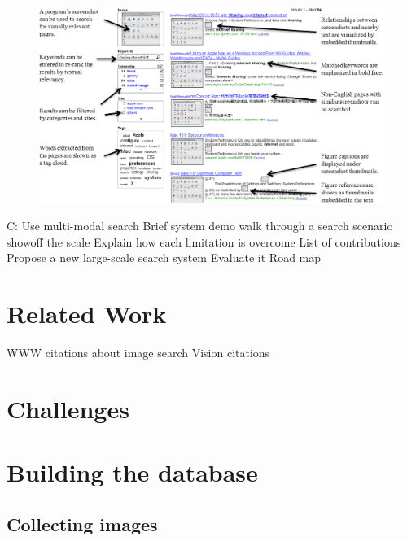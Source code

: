 \documentclass{www2010-submission}
\begin{document}
\begin{figure}
\includegraphics[width=2\columnwidth]{figure/main_result.png}
\end{figure}

%

C: Use multi-modal search
    Brief system demo
        walk through a search scenario
        showoff the scale
    Explain how each limitation is overcome
    List of contributions
        Propose a new large-scale search system
        Evaluate it
    Road map

\section{Related Work}
    WWW citations about image search
    Vision citations

\section{Challenges}

\section{Building the database}

\subsection{Collecting images}
\end{document}
